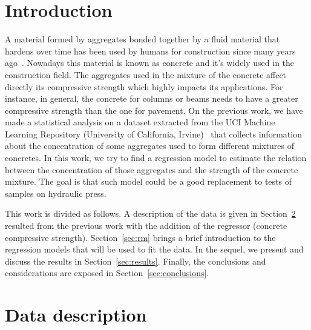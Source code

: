 \documentclass[conference]{IEEEtran}
\begin{document}
\section{Introduction}
A material formed by aggregates bonded together by a fluid material that hardens over time has been used by humans for construction since many years ago~\cite{b3}. Nowadays this material is known as concrete and it's widely used in the construction field. The aggregates used in the mixture of the concrete affect directly its compressive strength which highly impacts its applications. For instance, in general, the concrete for columns or beams needs to have a greater compressive strength than the one for pavement. On the previous work, we have made a statistical analysis on a dataset extracted from the UCI Machine Learning Repository (University of California, Irvine)~\cite{b4} that collects information about the concentration of some aggregates used to form different mixtures of concretes. In this work, we try to find a regression model to estimate the relation between the concentration of those aggregates and the strength of the concrete mixture. The goal is that such model could be a good replacement to tests of samples on hydraulic press.

This work is divided as follows. A description of the data is given in Section~\ref{sec:data_description} resulted from the previous work with the addition of the regressor (concrete compressive strength). Section~\ref{sec:rm} brings a brief introduction to the regression models that will be used to fit the data. In the sequel, we present and discuss the results in Section~\ref{sec:results}. Finally, the conclusions and considerations are exposed in Section~\ref{sec:conclusions}.


\section{Data description}\label{sec:data_description}
\end{document}
